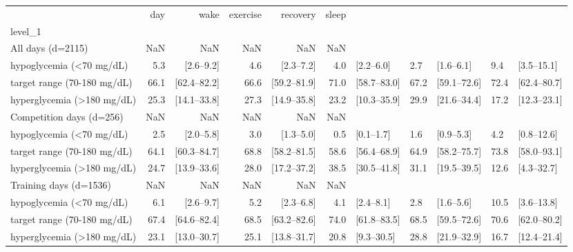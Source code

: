 \begin{tabular}{lrrrrr}
\toprule
{} &                  day &                 wake &             exercise &             recovery &                sleep \\
level_1                     &                      &                      &                      &                      &                      \\
\midrule
All days (d=2115)           &                  NaN &                  NaN &                  NaN &                  NaN &                  NaN \\
hypoglycemia (<70 mg/dL)    &     5.3 & [2.6--9.2] &     4.6 & [2.3--7.2] &     4.0 & [2.2--6.0] &     2.7 & [1.6--6.1] &    9.4 & [3.5--15.1] \\
target range (70-180 mg/dL) &  66.1 & [62.4--82.2] &  66.6 & [59.2--81.9] &  71.0 & [58.7--83.0] &  67.2 & [59.1--72.6] &  72.4 & [62.4--80.7] \\
hyperglycemia (>180 mg/dL)  &  25.3 & [14.1--33.8] &  27.3 & [14.9--35.8] &  23.2 & [10.3--35.9] &  29.9 & [21.6--34.4] &  17.2 & [12.3--23.1] \\
Competition days (d=256)    &                  NaN &                  NaN &                  NaN &                  NaN &                  NaN \\
hypoglycemia (<70 mg/dL)    &     2.5 & [2.0--5.8] &     3.0 & [1.3--5.0] &     0.5 & [0.1--1.7] &     1.6 & [0.9--5.3] &    4.2 & [0.8--12.6] \\
target range (70-180 mg/dL) &  64.1 & [60.3--84.7] &  68.8 & [58.2--81.5] &  58.6 & [56.4--68.9] &  64.9 & [58.2--75.7] &  73.8 & [58.0--93.1] \\
hyperglycemia (>180 mg/dL)  &  24.7 & [13.9--33.6] &  28.0 & [17.2--37.2] &  38.5 & [30.5--41.8] &  31.1 & [19.5--39.5] &   12.6 & [4.3--32.7] \\
Training days (d=1536)      &                  NaN &                  NaN &                  NaN &                  NaN &                  NaN \\
hypoglycemia (<70 mg/dL)    &     6.1 & [2.6--9.7] &     5.2 & [2.3--6.8] &     4.1 & [2.4--8.1] &     2.8 & [1.6--5.6] &   10.5 & [3.6--13.8] \\
target range (70-180 mg/dL) &  67.4 & [64.6--82.4] &  68.5 & [63.2--82.6] &  74.0 & [61.8--83.5] &  68.5 & [59.5--72.6] &  70.6 & [62.0--80.2] \\
hyperglycemia (>180 mg/dL)  &  23.1 & [13.0--30.7] &  25.1 & [13.8--31.7] &   20.8 & [9.3--30.5] &  28.8 & [21.9--32.9] &  16.7 & [12.4--21.4] \\
\bottomrule
\end{tabular}

